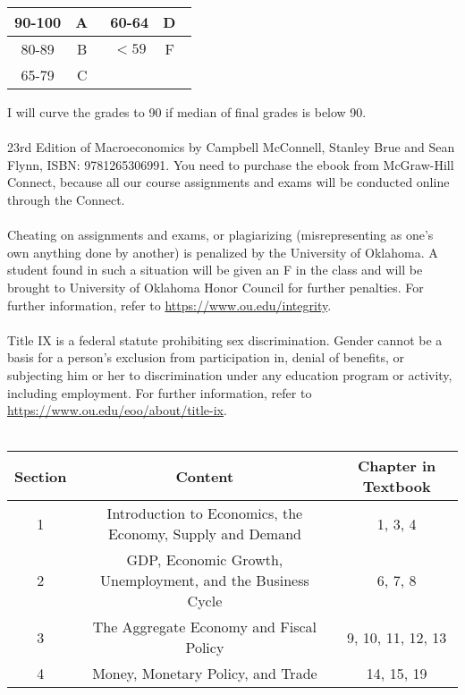 \documentclass[12pt,letterpaper]{article}
\begin{document}
\begin{center}
	\begin{tabular}{|c|c|c|c|}
		\hline
		90-100 & A\quad \ &  60-64&  D\quad \ \\ \hline
		80-89& B\quad \ &  $<59$ & F\quad \ \\ \hline
		65-79& C\quad \ &   &   \\ \hline
	\end{tabular}
\end{center}
{\color{red} I will curve the grades to 90 if median of final grades is below 90.}\bigskip\\
\medskip\\
23rd Edition of Macroeconomics by Campbell McConnell, Stanley Brue and Sean Flynn, ISBN: 9781265306991. You need to purchase the ebook from McGraw-Hill Connect, because all our course assignments and exams will be conducted online through the Connect.\bigskip\\
\medskip\\
Cheating on assignments and exams, or plagiarizing (misrepresenting as one’s own anything done by another) is penalized by the University of Oklahoma. A student found in such a situation will be given an F in the class and will be brought to University of Oklahoma Honor Council for further penalties. For further information, refer to \href{https://www.ou.edu/integrity}{https://www.ou.edu/integrity}.\bigskip\\
\medskip\\
Title IX is a federal statute prohibiting sex discrimination. Gender cannot be a basis for a person’s exclusion from participation in, denial of benefits, or subjecting him or her to discrimination under any education program or activity, including employment. For further information, refer to \href{https://www.ou.edu/eoo/about/title-ix}{https://www.ou.edu/eoo/about/title-ix}.\bigskip\\
\medskip\\
\begin{center}
\begin{tabular}{ccc}
	\toprule
	Section & Content&Chapter in Textbook\\
	\midrule
	1 & Introduction to Economics, the Economy, Supply and Demand&1, 3, 4\\
	\midrule
	2 & GDP, Economic Growth, Unemployment, and the Business Cycle&6, 7, 8\\
	\midrule
	3 & The Aggregate Economy and Fiscal Policy&9, 10, 11, 12, 13\\
	\midrule
	4 & Money, Monetary Policy, and Trade&14, 15, 19\\
	\bottomrule
\end{tabular}
\end{center}
\end{document}
